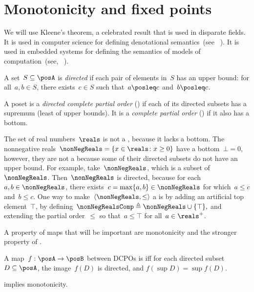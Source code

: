 \section{Monotonicity and fixed points}
\label{sec:Monotonicity-and-fixed}

We will use Kleene's theorem, a celebrated result that is used in
disparate fields. It is used in computer science for defining denotational
semantics~(see \eg~\cite{manes86}). It is used in embedded systems
for defining the semantics of models of computation~(see, \eg~\cite{lee10}).

\begin{definition}
    A set~$S\subseteq\posA$ is \emph{directed} if each pair of elements
    in~$S$ has an upper bound: for all~$a,b\in S$, there exists~$c\in S$
    such that~$a\posleq c$ and~$b\posleq c$.
\end{definition}

\begin{definition}[Completeness]
    \label{def:cpo}A poset is a \emph{directed complete partial order}
    (\DCPO) if each of its directed subsets has a supremum (least of
    upper bounds). It is a \emph{complete partial order} (\CPO) if it
    also has a bottom.

\end{definition}
\begin{example}
    \label{exa:Rcomp}The set of real numbers~$\reals$ is not
    a \CPO, because it lacks a bottom. The nonnegative reals~$\nonNegReals=\{x\in\reals \colon x\geq0\}$
    have a bottom~$\bot=0$, however, they are not a \DCPO because some
    of their directed subsets do not have an upper bound. For example,
    take~$\nonNegReals$, which is a subset of~$\nonNegReals$. Then~$\nonNegReals$
    is directed, because for each~$a,b\in\nonNegReals$, there exists~$c=\max\{a,b\}\in\nonNegReals$
    for which~$a\leq c$ and~$b\leq c$. One way to make~$\left\langle \nonNegReals,\leq\right\rangle $
    a \CPO is by adding an artificial top element~$\top$, by defining~$\nonNegRealsComp\triangleq\nonNegReals\cup\{\top\},$
    and extending the partial order~$\leq$ so that~$a\leq\top$ for
    all~$a\in\reals^{+}$.
\end{example}

A property of maps that will be important are monotonicity and
the stronger property of \scottcontinuity.

\begin{definition}[\scottcontinuity]
    \label{def:scott}A map~$f:\posA\rightarrow\posB$ between DCPOs
    is\textbf{ }\emph{\scottcontinuous{}}\textbf{ }iff for each directed
    subset~$D\subseteq\posA$, the image~$f(D)$ is directed, and $f(\sup D)=\sup f(D).$
\end{definition}
\begin{remark}
    \scottcontinuity implies monotonicity.
\end{remark}

